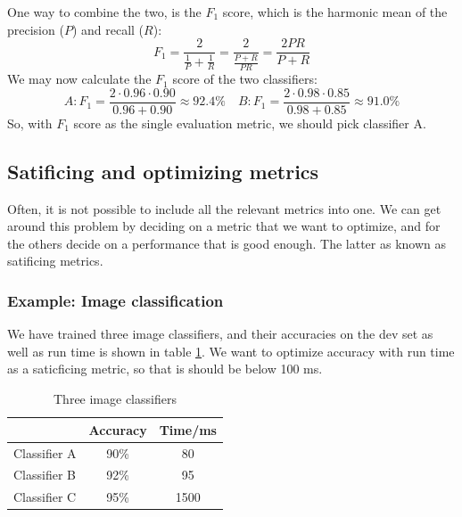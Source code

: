 \documentclass[12pt, a4paper]{article}
\numberwithin{equation}{section}
\begin{document}
One way to combine the two, is the $F_1$ score, which is the harmonic mean of the precision ($P$) and recall ($R$):
\begin{equation}
F_1=\frac{2}{\frac{1}{P}+\frac{1}{R}}=\frac{2}{\frac{P+R}{PR}}=\frac{2PR}{P+R}
\end{equation}
We may now calculate the $F_1$ score of the two classifiers:
\begin{equation}
A: F_1=\frac{2\cdot 0.96\cdot 0.90}{0.96+0.90}\approx 92.4\%\quad
B: F_1=\frac{2\cdot 0.98\cdot 0.85}{0.98+0.85}\approx 91.0\%
\end{equation}
So, with $F_1$ score as the single evaluation metric, we should pick classifier A.

\subsection{Satificing and optimizing metrics}
Often, it is not possible to include all the relevant metrics into one. We can get around this problem by deciding on a metric that we want to optimize, and for the others decide on a performance that is good enough. The latter as known as satificing metrics.

\subsubsection{Example: Image classification}
We have trained three image classifiers, and their accuracies on the dev set as well as run time is shown in table \ref{table:satisficing}. We want to optimize accuracy with run time as a saticficing metric, so that is should be below 100 ms.

\begin{table}
\centering
\label{table:satisficing}
\begin{tabular}{l|c|c|}
\cline{2-3}
                                   & \multicolumn{1}{l|}{Accuracy} & \multicolumn{1}{l|}{Time/ms} \\ \hline
\multicolumn{1}{|l|}{Classifier A} & 90\%                           & 80                        \\ \hline
\multicolumn{1}{|l|}{Classifier B} & 92\%                           & 95                        \\ \hline
\multicolumn{1}{|l|}{Classifier C} & 95\%                           & 1500                        \\ \hline
\end{tabular}
\caption{Three image classifiers}
\end{table}
\end{document}
